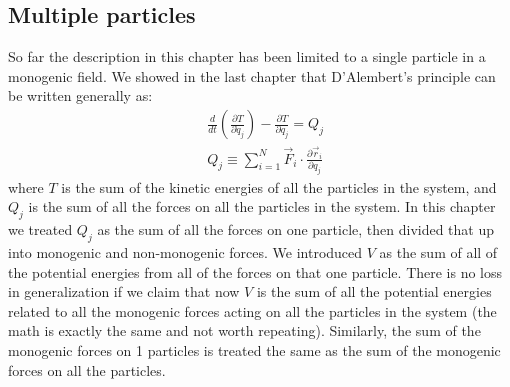 \subsection{Multiple particles}
So far the description in this chapter has been limited to a single particle in a monogenic field. We showed in the last chapter that D'Alembert's principle can be written generally as:
\begin{align}
&\frac{d}{dt}\left(\frac{\partial T}{\partial \dot{q}_j} \right) - \frac{\partial T}{\partial q_j}=Q_j\nonumber\\
&Q_j\equiv \sum_{i=1}^N\vec{F}_i\cdot\frac{\partial\vec{r}_i}{\partial q_j}
\end{align}
where $T$ is the sum of the kinetic energies of all the particles in the system, and $Q_j$ is the sum of all the forces on all the particles in the system. In this chapter we treated $Q_j$ as the sum of all the forces on one particle, then divided that up into monogenic and non-monogenic forces. We introduced $V$ as the sum of all of the potential energies from all of the forces on that one particle. There is no loss in generalization if we claim that now $V$ is the sum of all the potential energies related to all the monogenic forces acting on all the particles in the system (the math is exactly the same and not worth repeating). Similarly, the sum of the monogenic forces on 1 particles is treated the same as the sum of the monogenic forces on all the particles.

